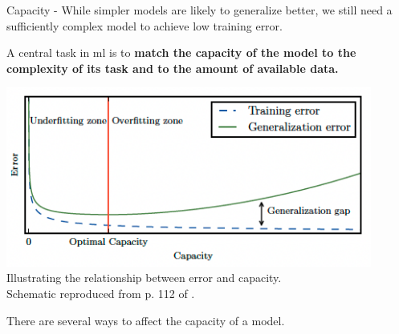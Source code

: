 \begin{frame}[t,allowframebreaks]{Capacity -}
    While simpler models are likely to generalize better,
    we still need a sufficiently complex model to achieve low training error.

    \framebreak


    A central task in \gls{ml} is to {\bf match the capacity of the model
    to the complexity of its task and to the amount of available data.}\\

    \vspace{0.1cm}

    \begin{center}
        \includegraphics[width=0.90\textwidth]
            {./images/training_issues/error_vs_capacity_1.png}\\
        {\tiny 
            Illustrating the relationship between error and capacity.\\
            \color{col:attribution} 
            Schematic reproduced from p. 112 of \cite{Goodfellow:2017MITDL}.\\
        }
    \end{center}

    \framebreak


    There are several ways to affect the capacity of a model.


\end{frame}
